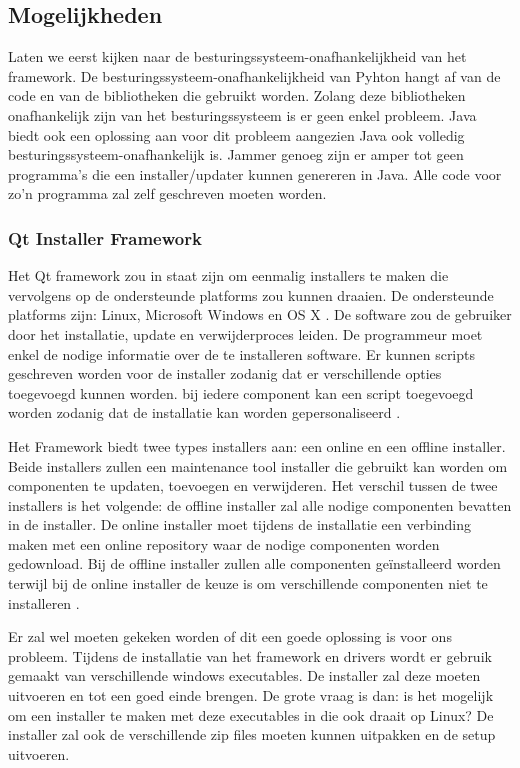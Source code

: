 \documentclass{article}
\begin{document}
\subsection{Mogelijkheden}\label{section:mogelijkheden}
Laten we eerst kijken naar de besturingssysteem-onafhankelijkheid van het framework.
De besturingssysteem-onafhankelijkheid van Pyhton hangt af van de code en van de bibliotheken die gebruikt worden.
Zolang deze bibliotheken onafhankelijk zijn van het besturingssysteem is er geen enkel probleem.
Java biedt ook een oplossing aan voor dit probleem aangezien Java ook volledig besturingssysteem-onafhankelijk is.
Jammer genoeg zijn er amper tot geen programma's die een installer/updater kunnen genereren in Java.
Alle code voor zo'n programma zal zelf geschreven moeten worden.

\subsubsection{Qt Installer Framework \citep{qtDoc}}
Het Qt framework zou in staat zijn om eenmalig installers te maken die vervolgens op de ondersteunde platforms zou kunnen draaien.
De ondersteunde platforms zijn: Linux, Microsoft Windows en OS X \citep{qtOverview}.
De software zou de gebruiker door het installatie, update en verwijderproces leiden.
De programmeur moet enkel de nodige informatie over de te installeren software.
Er kunnen scripts geschreven worden voor de installer zodanig dat er verschillende opties toegevoegd kunnen worden.
bij iedere component kan een script toegevoegd worden zodanig dat de installatie kan worden gepersonaliseerd \citep{qtDocScript}.

Het Framework biedt twee types installers aan: een online en een offline installer.
Beide installers zullen een maintenance tool installer die gebruikt kan worden om componenten te updaten, toevoegen en verwijderen.
Het verschil tussen de twee installers is het volgende: de offline installer zal alle nodige componenten bevatten in de installer.
De online installer moet tijdens de installatie een verbinding maken met een online repository waar de nodige componenten worden gedownload. 
Bij de offline installer zullen alle componenten ge\"installeerd worden terwijl bij de online installer de keuze is om verschillende componenten niet te installeren \citep{qtOverview}.

Er zal wel moeten gekeken worden of dit een goede oplossing is voor ons probleem.
Tijdens de installatie van het framework en drivers wordt er gebruik gemaakt van verschillende windows executables. 
De installer zal deze moeten uitvoeren en tot een goed einde brengen.
De grote vraag is dan: is het mogelijk om een installer te maken met deze executables in die ook draait op Linux?
De installer zal ook de verschillende zip files moeten kunnen uitpakken en de setup uitvoeren.
\end{document}
